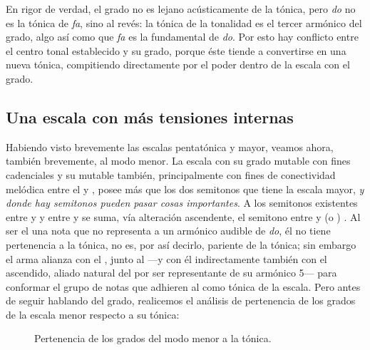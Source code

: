 \documentclass[a4paper,11pt]{article}
\begin{document}
\begin{multicols}{2}
    En rigor de verdad, el  grado no es lejano acústicamente de la tónica, pero \emph{do} no es la tónica de \emph{fa}, sino al revés: la tónica de la tonalidad es el tercer armónico del  grado, algo así como que \emph{fa} es la fundamental de \emph{do}. Por esto hay conflicto entre el centro tonal establecido y su  grado, porque éste tiende a convertirse en una nueva tónica, compitiendo directamente por el poder dentro de la escala con el  grado.

    \subsection{Una escala con más tensiones internas}\label{subsec:esc-mas-tensiones}
    Habiendo visto brevemente las escalas pentatónica y mayor, veamos ahora, también brevemente, al modo menor. La escala  con su  grado mutable con fines cadenciales y su  mutable también, principalmente con fines de conectividad melódica entre el  y , posee más que los dos semitonos que tiene la escala mayor, \emph{y donde hay semitonos pueden pasar cosas importantes}. A los semitonos existentes entre  y  y entre  y  se suma, vía alteración ascendente, el semitono entre  y  (o ) \hbox{.} Al ser el  una nota que no representa a un armónico audible de \emph{do}, él no tiene pertenencia a la tónica, no es, por así decirlo, pariente de la tónica; sin embargo el  arma alianza con el , junto al  ---y con él indirectamente también con el  ascendido, aliado natural del  por ser representante de su armónico 5--- para conformar el grupo de notas que adhieren al  como tónica de la escala. Pero antes de seguir hablando del  grado, realicemos el análisis de pertenencia de los grados de la escala menor respecto a su tónica:
\end{multicols}

\begin{figure}[ht]
\centering
{}
\caption{Pertenencia de los grados del modo menor a la tónica.}\label{fig:pertenencia-menor}
\end{figure}
\end{document}
